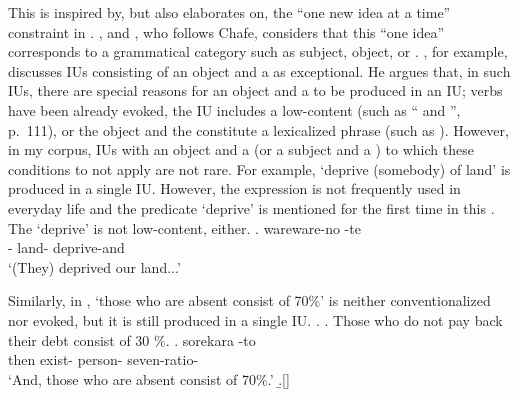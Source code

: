 This is inspired by, but also elaborates on, the ``one new idea at a time'' constraint in .
, and , who follows Chafe,
considers that this ``one idea'' corresponds to a grammatical category such as subject, object, or .
, for example, discusses IUs consisting of an object and a  as exceptional.
He argues that,
in such IUs,
there are special reasons for an object and a  to be produced in an IU;
verbs have been already evoked,
the IU includes a low-content  (such as `` and '', p.~111), or
the object and the  constitute a lexicalized phrase (such as ).
However, in my corpus,
IUs with an object and a  (or a subject and a ) to which these conditions to not apply are not rare.
For example,
 `deprive (somebody) of land'
is produced in a single IU.
However, the expression is not frequently used in everyday life
and the predicate  `deprive' is mentioned for the first time in this .
The   `deprive' is not low-content, either.
%
\exg. wareware-no {\iub}  -te {\iub} \\
      - {} land- deprive-and {} \\
      `(They) deprived our land...'

Similarly, in \Next[b],
 `those who are absent consist of 70\%'
is neither conventionalized nor evoked,
but it is still produced in a single IU.
%
\ex.
 \a. Those who do not pay back their debt consist of 30 \%.
 \bg. sorekara {\iub}   -to {\iub} \\
      then {} exist- person- seven-ratio- {} \\
      `And, those who are absent consist of 70\%.'
 \b.[] 

